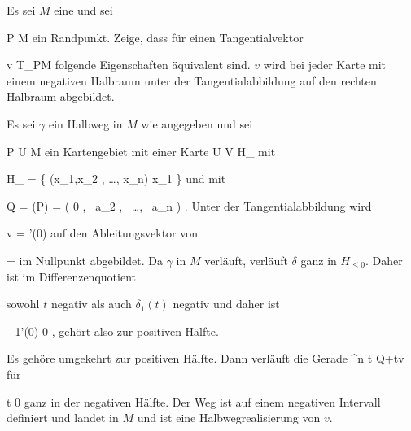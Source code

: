 {

Es sei $M$ eine
und sei

\mavergleichskette
{\vergleichskette
{ P
}
{ \in }{ \partial M
}
{  }{
}
{    }{
}
{   }{
}
}
{}{}{}
ein Randpunkt. Zeige, dass für einen Tangentialvektor

\mavergleichskette
{\vergleichskette
{ v
}
{ \in }{ T_PM
}
{  }{
}
{    }{
}
{   }{
}
}
{}{}{}
folgende Eigenschaften äquivalent sind.
 { $v$ wird bei jeder Karte mit einem negativen Halbraum unter der Tangentialabbildung auf den rechten Halbraum abgebildet.
}

}
{

Es sei $\gamma$ ein Halbweg in $M$ wie angegeben und sei

\mavergleichskette
{\vergleichskette
{ P
}
{ \in }{  U
}
{ \subseteq }{ M
}
{    }{
}
{   }{
}
}
{}{}{}
ein Kartengebiet mit einer Karte
\maabbdisp {\alpha} { U } {V \subseteq  H_{}
} {}
mit

\mavergleichskettedisp
{\vergleichskette
{  H_{}
}
{ =} { \left\{ (x_1,x_2 , \ldots, x_n)  \mid   x_1         \right\}
}
{ } {
}
{ } {
}
{ } {
}
}
{}{}{}
und mit

\mavergleichskettedisp
{\vergleichskette
{ Q
}
{ =} { \alpha(P)
}
{ =} { \left(  0   , \,  a_2  , \,   \ldots , \,  a_n                \right)
}
{ } {
}
{ } {
}
}
{}{}{.}
Unter der Tangentialabbildung wird

\mavergleichskette
{\vergleichskette
{ v
}
{ = }{ \gamma'(0)
}
{  }{
}
{    }{
}
{   }{
}
}
{}{}{}
auf den Ableitungsvektor von

\mavergleichskette
{\vergleichskette
{ \delta
}
{ = }{ \alpha \circ \gamma
}
{  }{
}
{    }{
}
{   }{
}
}
{}{}{}
im Nullpunkt abgebildet. Da $\gamma$ in $M$ verläuft, verläuft $\delta$ ganz in $H_{\leq 0}$. Daher ist im Differenzenquotient

 {  }

sowohl $t$ negativ als auch $\delta_1(t)$ negativ und daher ist

\mavergleichskettedisp
{\vergleichskette
{  \delta_1'(0)
}
{ \geq} { 0
}
{ } {
}
{ } {
}
{ } {
}
}
{}{}{,}
gehört also zur positiven Hälfte.

Es gehöre umgekehrt
 zur positiven Hälfte. Dann verläuft die Gerade
\maabbeledisp {\delta} {\R} {\R^n
} { t } { Q+tv
} {}
für

\mavergleichskette
{\vergleichskette
{ t
}
{ \leq }{  0
}
{  }{
}
{    }{
}
{   }{
}
}
{}{}{}
ganz in der negativen Hälfte. Der Weg
 ist auf einem negativen Intervall definiert und landet in $M$ und ist eine Halbwegrealisierung von $v$.

 }

